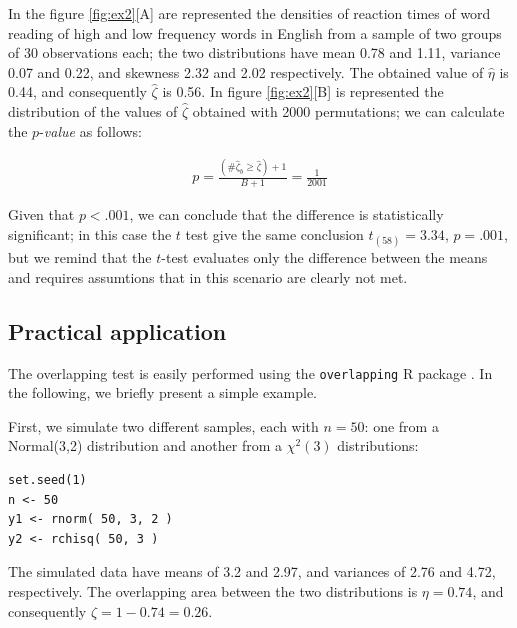 \documentclass[twocolumn]{article}\usepackage[]{graphicx}\usepackage[]{xcolor}
\makeatletter
\newenvironment{kframe}{%
 \def\at@end@of@kframe{}%
 \ifinner\ifhmode%
  \def\at@end@of@kframe{\end{minipage}}%
  \begin{minipage}{\columnwidth}%
 \fi\fi%
 \def\FrameCommand##1{\hskip\@totalleftmargin \hskip-\fboxsep
 \colorbox{shadecolor}{##1}\hskip-\fboxsep
     \hskip-\linewidth \hskip-\@totalleftmargin \hskip\columnwidth}%
 \MakeFramed {\advance\hsize-\width
   \@totalleftmargin\z@ \linewidth\hsize
   \@setminipage}}%
 {\par\unskip\endMakeFramed%
 \at@end@of@kframe}
\newenvironment{knitrout}{}{} %
\makeatother
\begin{document}
In the figure \ref{fig:ex2}[A] are represented the densities of reaction times of word reading of high and low frequency words in English from a sample of two groups of 30 observations each; the two distributions have mean 0.78 and 1.11, variance 0.07 and 0.22, and skewness 2.32 and 2.02 respectively. The obtained value of $\hat{\eta}$ is 0.44, and consequently $\hat{\zeta}$ is 0.56. In figure \ref{fig:ex2}[B] is represented the distribution of the values of $\hat{\zeta}$ obtained with 2000 permutations; we can calculate the $p$-\emph{value} as follows:

\begin{eqnarray*}
p = \frac{(\# \hat{\zeta}_b \geq \hat{\zeta})+1 }{B+1} = \frac{1}{ 2001 } %
\end{eqnarray*}

Given that $p < .001$, we can conclude that the difference is statistically significant; in this case the $t$ test give the same conclusion $t_{(58)} = 3.34$, $p = .001$, but we remind that the $t$-test evaluates only the difference between the means and requires assumtions that in this scenario are clearly not met.

\subsection{Practical application}

The overlapping test is easily performed using the \texttt{overlapping} R package  \cite{overlapping:package}. In the following, we briefly present a simple example.  




First, we simulate two different samples, each with $n = 50$: one from a Normal(3,2) distribution and another from a $\chi^2(3)$ distributions:
\begin{knitrout}
\color{fgcolor}\begin{kframe}
\begin{verbatim}
set.seed(1) 
n <- 50 
y1 <- rnorm( 50, 3, 2 ) 
y2 <- rchisq( 50, 3 ) 
\end{verbatim}
\end{kframe}
\end{knitrout}

The simulated data have means of  3.2 and 2.97, and variances of 2.76 and 4.72, respectively. The overlapping area between the two distributions is $\eta = 0.74$, and consequently $\zeta = 1-0.74 = 0.26$. 
\end{document}
